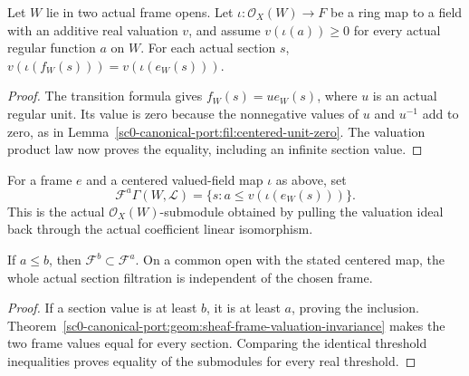 \begin{theorem}
\label{sc0-canonical-port:geom:sheaf-frame-valuation-invariance}
\leanok
Let \(W\) lie in two actual frame opens. Let
\(\iota:\mathcal O_X(W)\to F\) be a ring map to a field
with an additive real valuation \(v\), and assume
\(v(\iota(a))\geq0\) for every actual regular function
\(a\) on \(W\). For each actual section \(s\),
\(v(\iota(f_W(s)))=v(\iota(e_W(s)))\).
\end{theorem}
\begin{proof}
The transition formula gives \(f_W(s)=u e_W(s)\), where
\(u\) is an actual regular unit. Its value is zero because
the nonnegative values of \(u\) and \(u^{-1}\) add to zero,
as in Lemma~\ref{sc0-canonical-port:fil:centered-unit-zero}. The valuation product
law now proves the equality, including an infinite section value.
\end{proof}

\begin{definition}
\label{sc0-canonical-port:geom:actual-local-section-filtration}
\leanok
For a frame \(e\) and a centered valued-field map \(\iota\)
as above, set
\[
 \mathcal F^a\Gamma(W,\mathcal L)
 =\{s:a\leq v(\iota(e_W(s)))\}.
\]
This is the actual \(\mathcal O_X(W)\)-submodule obtained
by pulling the valuation ideal back through the actual
coefficient linear isomorphism.
\end{definition}

\begin{theorem}
\label{sc0-canonical-port:geom:local-section-filtration-invariance}
\leanok
If \(a\leq b\), then \(\mathcal F^b\subset\mathcal F^a\).
On a common open with the stated centered map, the whole
actual section filtration is independent of the chosen frame.
\end{theorem}
\begin{proof}
If a section value is at least \(b\), it is at least \(a\),
proving the inclusion. Theorem~\ref{sc0-canonical-port:geom:sheaf-frame-valuation-invariance}
makes the two frame values equal for every section. Comparing
the identical threshold inequalities proves equality of the
submodules for every real threshold.
\end{proof}

